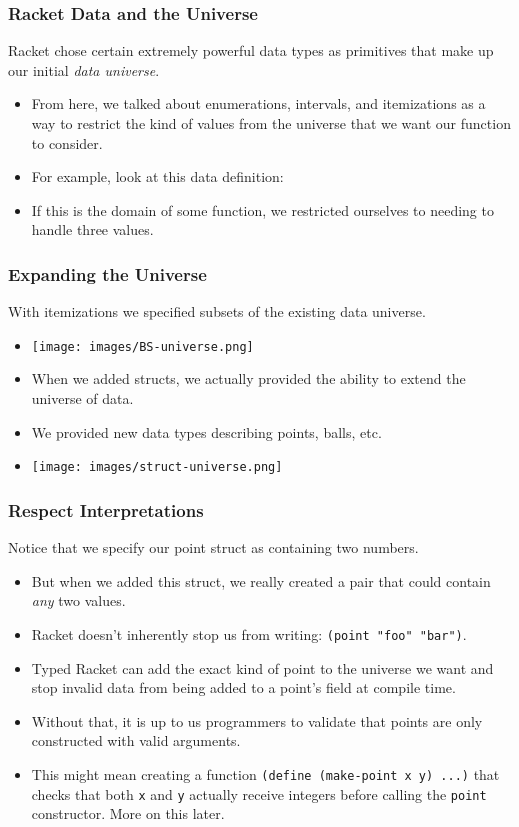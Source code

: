 \documentclass{beamer}
\begin{document}

\begin{frame}
  \frametitle{Racket Data and the Universe}
  Racket chose certain extremely powerful data types as primitives
  that make up our initial \emph{data universe}.
  \begin{itemize}
  \item<2-> From here, we talked about enumerations, intervals,
    and itemizations as a way to restrict the kind of values from
    the universe that we want our function to consider.
  \item<3-> For example, look at this data definition:
    \BSData
  \item<4-> If this is the domain of some function, we restricted
    ourselves to needing to handle three values.  
  \end{itemize}
\end{frame}

\begin{frame}
  \frametitle{Expanding the Universe}
With itemizations we specified subsets of the existing data universe.
\begin{itemize}
  \item<1-> \texttt{[image: images/BS-universe.png]}    
  \item<2-> When we added structs, we actually provided the ability to
  extend the universe of data.
  \item<3-> We provided new data types describing points, balls, etc.
  \item<4-> \texttt{[image: images/struct-universe.png]}
  \end{itemize}
\end{frame}

\begin{frame}
  \frametitle{Respect Interpretations}
  Notice that we specify our point struct as containing
  two numbers.
  \begin{itemize}
  \item<2-> But when we added this struct, we really created a pair
    that could contain \emph{any} two values.
  \item<3-> Racket doesn't inherently stop us from writing:
    \texttt{(point "foo" "bar")}.
  \item<4-> Typed Racket can add the exact kind of point to the universe we want and stop invalid data from being added to a point's
    field at compile time.
  \item<5-> Without that, it is up to us programmers to validate
    that points are only constructed with valid arguments.
  \item<6-> This might mean creating a function \texttt{(define (make-point x y) ...)} that checks
    that both \texttt{x} and \texttt{y} actually receive integers before calling the \texttt{point} constructor. More on this later.
  \end{itemize}
\end{frame}
\end{document}
